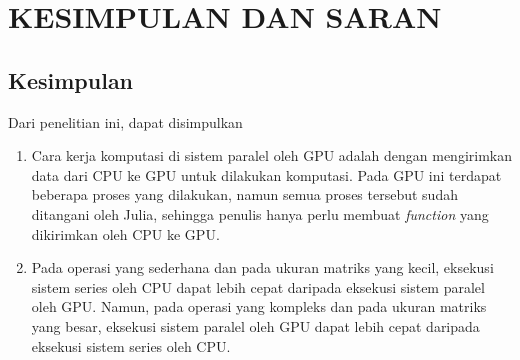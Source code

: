 \chapter{KESIMPULAN DAN SARAN}
\section{Kesimpulan}
Dari penelitian ini, dapat disimpulkan
\begin{enumerate}
	\item Cara kerja komputasi di sistem paralel oleh GPU adalah dengan mengirimkan data dari CPU ke GPU untuk dilakukan komputasi. Pada GPU ini terdapat beberapa proses yang dilakukan, namun semua proses tersebut sudah ditangani oleh Julia, sehingga penulis hanya perlu membuat \emph{function} yang dikirimkan oleh CPU ke GPU.
	\item Pada operasi yang sederhana dan pada ukuran matriks yang kecil, eksekusi sistem series oleh CPU dapat lebih cepat daripada eksekusi sistem paralel oleh GPU. Namun, pada operasi yang kompleks dan pada ukuran matriks yang besar, eksekusi sistem paralel oleh GPU dapat lebih cepat daripada eksekusi sistem series oleh CPU.
\end{enumerate}


